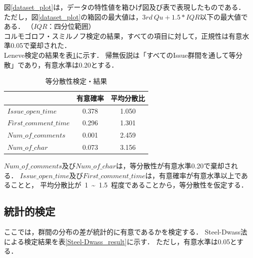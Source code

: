 図\ref{dataset_plot}は，データの特性値を箱ひげ図及び表で表現したものである．
ただし，図\ref{dataset_plot}の箱図の最大値は，$3rd~Qu + 1.5 * IQR$以下の最大値である．
（$IQR$：四分位範囲）
\\
コルモゴロフ・スミルノフ検定の結果，すべての項目に対して，正規性は有意水準0.05で棄却された．
\\
Leneve検定の結果を表\ref{levene_result}に示す．
帰無仮説は「すべてのIssue群間を通して等分散」であり，有意水準は0.20とする．

\begin{table}[h]
  \begin{center}
  \caption{等分散性検定・結果}
  \begin{tabular}{l|c c} 
    \hline
     & 有意確率 & 平均分散比 \\ 
    \hline \hline
    $Issue\_open\_time$ & 0.378 & 1.050 \\
    $First\_comment\_time$ & 0.296 & 1.301 \\
    $Num\_of\_comments$ & 0.001 & 2.459 \\
    $Num\_of\_char$ & 0.073 & 3.156 \\
    \hline
  \end{tabular}
  \label{levene_result}
  \end{center}
\end{table}

$Num\_of\_comments$及び$Num\_of\_char$は，等分散性が有意水準0.20で棄却される．
$Issue\_open\_time$及び$First\_comment\_time$は，有意確率が有意水準以上であることと，
平均分散比が~1~\textasciitilde ~1.5~程度であることから，等分散性を仮定する．


\subsection{統計的検定}
ここでは，群間の分布の差が統計的に有意であるかを検定する．
Steel-Dwass法による検定結果を表\ref{Steel-Dwass_result}に示す．
ただし，有意水準は0.05とする．

